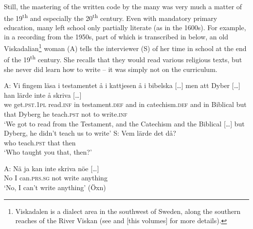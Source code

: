 \documentclass[output=paper]{langscibook}
\begin{document}
Still, the mastering of the written code by the many was very much a matter of the 19\textsuperscript{th} and especially the 20\textsuperscript{th} century. Even with mandatory primary education, many left school only partially literate (as in the 1600s). For example, in a recording from the 1950s, part of which is transcribed in  below, an old Viskadalian\footnote{Viskadalen is a dialect area in the southwest of Sweden, along the southern reaches of the River Viskan (see \citealt{Petzell2017,Petzell2018} and \citeyear{chapters/07} [this volumes] for more details).} woman (A) tells the interviewer (S) of her time in school at the end of the 19\textsuperscript{th} century. She recalls that they would read various religious texts, but she never did learn how to write – it was simply not on the curriculum.


\ea \label{ex:intro:4}
\ea
\gll A:    Vi   fingem                  läsa             i     testamentet            å     i     kattjesen å     i     bibelska […] men att   Dyber […] han lärde inte   å   {skriva […]}\\
     {}     we   get.\textsc{pst.1pl}  read.\textsc{inf} in   testament.\textsc{def} and   in   catechism.\textsc{def} and   in   Biblical   {}       but   that Dyberg   {}    he   teach.\textsc{pst} not   to   write\textsc{.inf}\\
    \glt `We got to read from the Testament, and the Catechism and the Biblical […] but Dyberg, he didn’t teach us to write’
\ex
\gll S:     Vem   lärde       det   då?\\
     {}  who    teach.\textsc{pst}  that  then\\
    \glt `Who taught you that, then?’

\gll A:   Nä   ja   kan           inte     skriva     nöe […]\\
  {} No  I  can\textsc{.prs.sg}   not  write   anything  \\
    \glt `No, I can’t write anything’ (Öxn)
\z
\z
\end{document}
